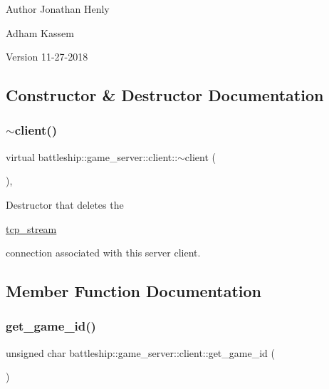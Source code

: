\begin{DoxyAuthor}{Author}
Jonathan Henly 

Adham Kassem 
\end{DoxyAuthor}
\begin{DoxyVersion}{Version}
11-\/27-\/2018 
\end{DoxyVersion}


\subsection{Constructor \& Destructor Documentation}
\mbox{\label{classbattleship_1_1game__server_1_1client_ac64f89eb976af431e4822dd777bdf320}} 
\subsubsection{\texorpdfstring{$\sim$client()}{~client()}}
{\footnotesize\ttfamily virtual battleship\+::game\+\_\+server\+::client\+::$\sim$client (\begin{DoxyParamCaption}{ }\end{DoxyParamCaption})\hspace{0.3cm}{\ttfamily [inline]}, {\ttfamily [virtual]}}

Destructor that deletes the
\begin{DoxyCode}
\hyperlink{classtcp__stream}{tcp\_stream} 
\end{DoxyCode}
 connection associated with this server client. 

\subsection{Member Function Documentation}
\mbox{\label{classbattleship_1_1game__server_1_1client_a232605975d752a2d5a30a606c5b890c6}} 
\subsubsection{\texorpdfstring{get\+\_\+game\+\_\+id()}{get\_game\_id()}\hspace{0.1cm}{\footnotesize\ttfamily [1/2]}}
{\footnotesize\ttfamily unsigned char battleship\+::game\+\_\+server\+::client\+::get\+\_\+game\+\_\+id (\begin{DoxyParamCaption}{ }\end{DoxyParamCaption})\hspace{0.3cm}{\ttfamily [inline]}}

